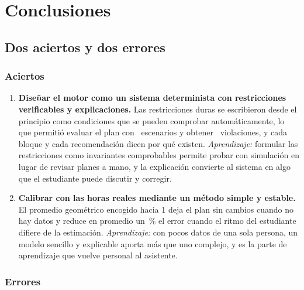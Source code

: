 \section{Conclusiones}\label{sec:conclusiones}

\subsection{Dos aciertos y dos errores}

\subsubsection*{Aciertos}

\begin{enumerate}
    \item \textbf{Diseñar el motor como un sistema determinista con restricciones verificables y explicaciones.} Las restricciones duras se escribieron desde el principio como condiciones que se pueden comprobar automáticamente, lo que permitió evaluar el plan con \resEscenarios\ escenarios y obtener \resViol\ violaciones, y cada bloque y cada recomendación dicen por qué existen. \emph{Aprendizaje:} formular las restricciones como invariantes comprobables permite probar con simulación en lugar de revisar planes a mano, y la explicación convierte al sistema en algo que el estudiante puede discutir y corregir.
    \item \textbf{Calibrar con las horas reales mediante un método simple y estable.} El promedio geométrico encogido hacia 1 deja el plan sin cambios cuando no hay datos y reduce en promedio un \resRedCalSes\,\% el error cuando el ritmo del estudiante difiere de la estimación. \emph{Aprendizaje:} con pocos datos de una sola persona, un modelo sencillo y explicable aporta más que uno complejo, y es la parte de aprendizaje que vuelve personal al asistente.
\end{enumerate}

\subsubsection*{Errores}

